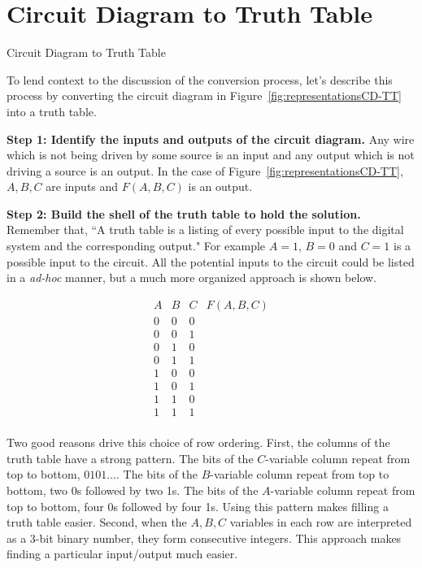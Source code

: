 \section{Circuit Diagram to Truth Table}
\begin{process}{Circuit Diagram to Truth Table}
\label{process:representationCDtoTT}
\label{page:representationCDtoTT}

To lend context to the discussion of the conversion process, let's describe this
process by converting the circuit diagram in Figure~\ref{fig:representationsCD-TT}
into a truth table.


\textbf{Step 1:  Identify the inputs and outputs of the circuit diagram.}
Any wire which is not being driven by some source is an input and 
any output which is not driving a source is an output.  In the case of 
Figure~\ref{fig:representationsCD-TT}, $A,B,C$ are inputs and $F(A,B,C)$ is an output.


\textbf{Step 2: Build the shell of the truth table to hold the solution. }
Remember that, ``A truth table is a listing of every possible  input to the 
digital system and the corresponding output."  For example $A=1$, $B=0$ and 
$C=1$ is a possible input to the circuit.  All the 
potential inputs to the circuit could be listed in a \textit{ad-hoc} 
manner, but a much more organized approach is shown below.

\label{page:TTshell}
$$\begin{array}{c|c|c||c}
A & B & C & F(A,B,C) \\ \hline \hline
0 & 0 & 0 &   \\ \hline
0 & 0 & 1 &   \\ \hline
0 & 1 & 0 &   \\ \hline
0 & 1 & 1 &   \\ \hline
1 & 0 & 0 &   \\ \hline
1 & 0 & 1 &   \\ \hline
1 & 1 & 0 &   \\ \hline
1 & 1 & 1 &   \\
\end{array}$$

Two good reasons drive this choice of row ordering.
First, the columns of the truth table have a strong pattern.
The bits of the $C$-variable column repeat from top to bottom, $0 1 0 1 \ldots$.
The bits of the $B$-variable column repeat from top to bottom, two 0s followed by two 1s.
The bits of the $A$-variable column repeat from top to bottom, four 0s followed by four 1s.
Using this pattern makes filling a truth table easier.  Second,
when the $A,B,C$ variables in each row are interpreted as a 
3-bit binary number, they form consecutive integers.  This approach
makes finding a particular input/output much easier.


\end{process}
